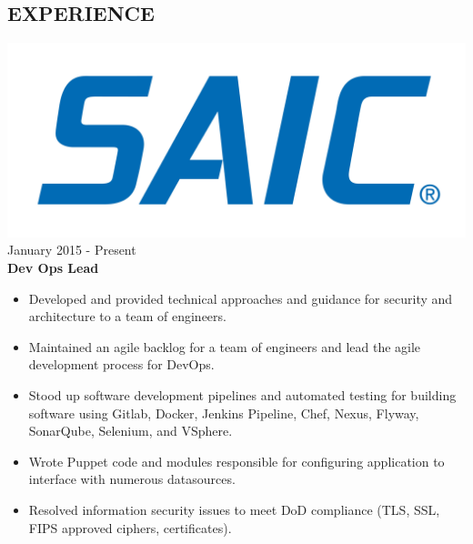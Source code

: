 \documentclass[12pt, line, margin]{res}
\begin{document}
\begin{resume}
\section{ EXPERIENCE} {\sl  \includegraphics[scale=0.015, trim=110 200 110 120]{resume_images/SAIC_logo_RGB-lg.jpg}} \hfill January 2015 - Present \\
                \textbf{Dev Ops Lead} 
                 \begin{itemize}  \itemsep -2pt %
	      \item   Developed and provided technical approaches and guidance for \newline
                                security and architecture to a team of engineers.
                 \item   Maintained an agile backlog for a team of engineers and lead the
                             agile development process for DevOps.
	      \item   Stood up software development pipelines and automated testing \newline
                               for building software using Gitlab, Docker, Jenkins Pipeline, Chef, 
                               Nexus, Flyway, SonarQube, Selenium, and VSphere.
                 \item  Wrote Puppet code and modules responsible for configuring  \newline
                               application to interface with numerous datasources.
	      \item   Resolved information security issues to meet DoD compliance\newline
                               (TLS, SSL, FIPS approved ciphers, certificates).
                \end{itemize}
                

\end{resume}
\end{document}
